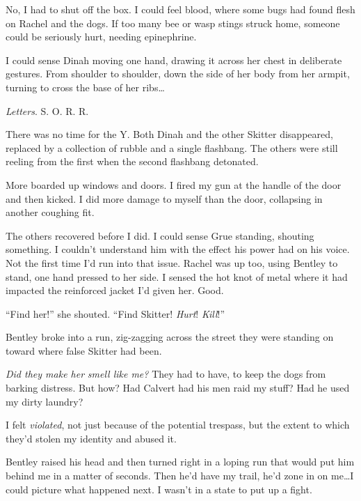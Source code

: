 No, I had to shut off the box.  I could feel blood, where some bugs had found flesh on Rachel and the dogs.  If too many bee or wasp stings struck home, someone could be seriously hurt, needing epinephrine.



I could sense Dinah moving one hand, drawing it across her chest in deliberate gestures.  From shoulder to shoulder, down the side of her body from her armpit, turning to cross the base of her ribs\ldots



\emph{Letters}.  S.  O.  R.  R.



There was no time for the Y.  Both Dinah and the other Skitter disappeared, replaced by a collection of rubble and a single flashbang.  The others were still reeling from the first when the second flashbang detonated.



More boarded up windows and doors.  I fired my gun at the handle of the door and then kicked.  I did more damage to myself than the door, collapsing in another coughing fit.



The others recovered before I did.  I could sense Grue standing, shouting something.  I couldn't understand him with the effect his power had on his voice.  Not the first time I'd run into that issue.  Rachel was up too, using Bentley to stand, one hand pressed to her side.  I sensed the hot knot of metal where it had impacted the reinforced jacket I'd given her.  Good.



``Find her!'' she shouted.  ``Find Skitter!  \emph{Hurt}!  \emph{Kill}!''



Bentley broke into a run, zig-zagging across the street they were standing on toward where false Skitter had been.



\emph{Did they make her }\emph{smell like me?}  They had to have, to keep the dogs from barking distress.  But how?  Had Calvert had his men raid my stuff?  Had he used my dirty laundry?



I felt \emph{violated}, not just because of the potential trespass, but the extent to which they'd stolen my identity and abused it.



Bentley raised his head and then turned right in a loping run that would put him behind me in a matter of seconds.  Then he'd have my trail, he'd zone in on me\ldots I could picture what happened next.  I wasn't in a state to put up a fight.



